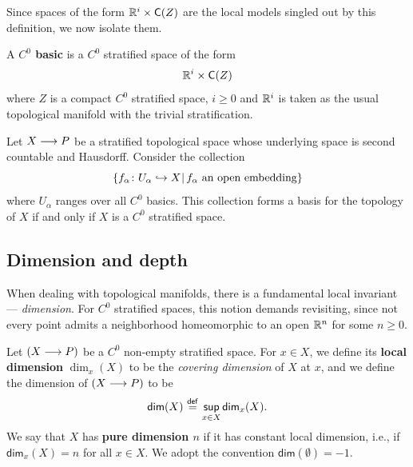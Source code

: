 Since spaces of the form $\mathbb R^i\times \mathsf C(Z)$ are the local models singled out by this definition, we now isolate them.
\begin{definition}\label{ch4:: def: C0 basics}
    A \textbf{$C^0$ basic} is a $C^0$ stratified space of the form 
    \begin{equation}
        \mathbb R^{i} \times \mathsf C(Z)
    \end{equation}
    where $Z$ is a compact $C^0$ stratified space, $i\geq 0$ and $\mathbb R^{i}$ is taken as the usual topological manifold with the trivial stratification. 
\end{definition}

\begin{lemma}\cite[Lemma~2.2.2]{AFT1}
    Let $X \longrightarrow P$ be a stratified topological space whose underlying space is second countable and Hausdorff. Consider the collection 
    \begin{equation}
        \{f_\alpha\colon U_\alpha \hookrightarrow X\mkern1mu | \, f_\alpha \text{ an open embedding} \}
    \end{equation}
    where $U_\alpha$ ranges over all $C^0$ basics. This collection forms a basis for the topology of $X$ if and only if $X$ is a $C^0$ stratified space.
\end{lemma}

\subsection{Dimension and depth}

When dealing with topological manifolds, there is a fundamental local invariant --- \emph{dimension}. For $C^0$ stratified spaces, this notion demands revisiting, since not every point admits a neighborhood homeomorphic to an open $\mathbb R^{n}$ for some $n \geq 0$. 

\begin{definition}
    Let $(X \longrightarrow P)$ be a $C^0$ non-empty stratified space. For $x\in X$, we define its \textbf{local dimension} $\dim_x(X)$ to be the \emph{covering dimension} of $X$ at $x$, and we define the dimension of $(X\longrightarrow P)$ to be 
    \begin{equation}
        \mathsf{dim}(X) \mkern1mu \overset{\sf def}{=} \mkern1mu \underset{x \in X}{\mathsf{sup}} \mkern1mu\mkern1mu \mathsf{dim}_{x}(X).
    \end{equation}
    We say that $X$ has \textbf{pure dimension $n$} if it has constant local dimension, i.e., if $\mathsf{dim}_{x}(X) = n$ for all $x\in X$. We adopt the convention $\mathsf{dim}(\emptyset) = -1$.
\end{definition}

